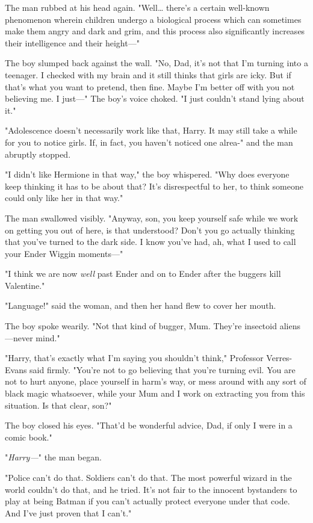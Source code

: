 The man rubbed at his head again. "Well{\ldots} there's a certain well-known 
phenomenon wherein children undergo a biological process which can sometimes 
make them angry and dark and grim, and this process also significantly 
increases their intelligence and their height---"

The boy slumped back against the wall. "No, Dad, it's not that I'm turning into 
a teenager. I checked with my brain and it still thinks that girls are icky. 
But if that's what you want to pretend, then fine. Maybe I'm better off with 
you not believing me. I just---" The boy's voice choked. "I just couldn't stand 
lying about it."

"Adolescence doesn't necessarily work like that, Harry. It may still take a 
while for you to notice girls. If, in fact, you haven't noticed one alrea-" and 
the man abruptly stopped.

"I didn't like Hermione in that way," the boy whispered. "Why does everyone 
keep thinking it has to be about that? It's disrespectful to her, to think 
someone could only like her in that way."

The man swallowed visibly. "Anyway, son, you keep yourself safe while we work 
on getting you out of here, is that understood? Don't you go actually thinking 
that you've turned to the dark side. I know you've had, ah, what I used to call 
your Ender Wiggin moments---"

"I think we are now \emph{well} past Ender and on to Ender after the buggers 
kill Valentine."

"Language!" said the woman, and then her hand flew to cover her mouth.

The boy spoke wearily. "Not that kind of bugger, Mum. They're insectoid 
aliens---never mind."

"Harry, that's exactly what I'm saying you shouldn't think," Professor 
Verres-Evans said firmly. "You're not to go believing that you're turning evil. 
You are not to hurt anyone, place yourself in harm's way, or mess around with 
any sort of black magic whatsoever, while your Mum and I work on extracting you 
from this situation. Is that clear, son?"

The boy closed his eyes. "That'd be wonderful advice, Dad, if only I were in a 
comic book."

"\emph{Harry---}" the man began.

"Police can't do that. Soldiers can't do that. The most powerful wizard in the 
world couldn't do that, and he tried. It's not fair to the innocent bystanders 
to play at being Batman if you can't actually protect everyone under that code. 
And I've just proven that I can't."

